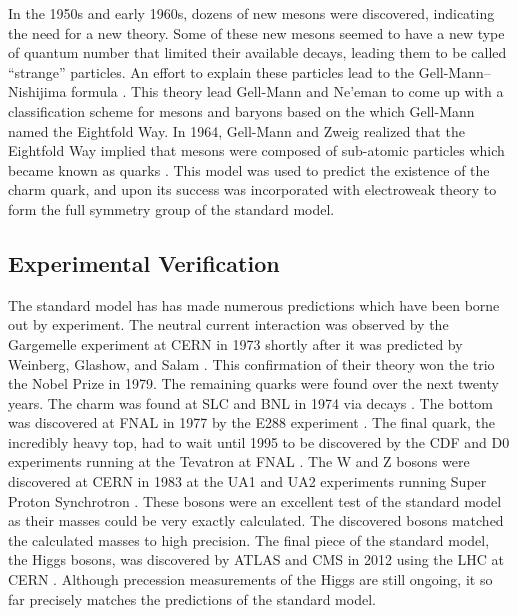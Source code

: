 In the 1950s and early 1960s, dozens of new mesons were discovered, indicating
the need for a new theory. Some of these new mesons seemed to have a new type
of quantum number that limited their available decays, leading them to be
called ``strange'' particles. An effort to explain these particles lead to the
Gell-Mann--Nishijima formula
\cite{nakano1953}\cite{nishijima1955}\cite{gellmann1956}. This theory lead
Gell-Mann and Ne'eman to come up with a classification scheme for mesons and
baryons based on the \SUthree which Gell-Mann named the Eightfold Way. In 1964,
Gell-Mann and Zweig realized that the Eightfold Way implied that mesons were
composed of sub-atomic particles which became known as quarks
\cite{gellmann1964}\cite{zweig1964}. This model was used to predict the
existence of the charm quark, and upon its success was incorporated with
electroweak theory to form the full \SUthreeSUtwoUone symmetry group of the
standard model.

\subsection{Experimental Verification}

The standard model has has made numerous predictions which have been borne out
by experiment. The neutral current interaction was observed by the Gargemelle
experiment at CERN in 1973 shortly after it was predicted by Weinberg, Glashow,
and Salam \cite{hasert1973}. This confirmation of their theory won the trio the
Nobel Prize in 1979. The remaining quarks were found over the next twenty
years. The charm was found at SLC and BNL in 1974 via \jpsi decays
\cite{aubert1974}\cite{augustin1974}. The bottom was discovered at FNAL in 1977
by the E288 experiment \cite{herb1977}. The final quark, the incredibly heavy
top, had to wait until 1995 to be discovered by the CDF and D0 experiments
running at the Tevatron at FNAL \cite{cdf1995}\cite{d01995}. The W and Z bosons
were discovered at CERN in 1983 at the UA1 and UA2 experiments running Super
Proton Synchrotron \cite{ua1_w}\cite{ua2_w}\cite{ua1_z}\cite{ua2_z}. These
bosons were an excellent test of the standard model as their masses could be
very exactly calculated. The discovered bosons matched the calculated masses to
high precision. The final piece of the standard model, the Higgs bosons, was
discovered by ATLAS and CMS in 2012 using the LHC at CERN
\cite{atlas_higgs}\cite{cms_higgs}. Although precession measurements of the
Higgs are still ongoing, it so far precisely matches the predictions of the
standard model.

